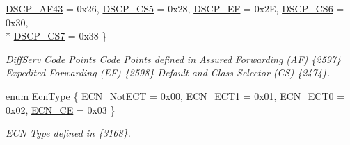 \begin{DoxyCompactItemize}
\hyperlink{classns3_1_1Ipv4Header_aaa17802e7732a689311b72d48d1a3450a615e936e2c88bc8e0f3d6b86b0a270b2}{D\+S\+C\+P\+\_\+\+A\+F43} = 0x26, 
\hyperlink{classns3_1_1Ipv4Header_aaa17802e7732a689311b72d48d1a3450a92772bf045d4537ab9425d9ef9acda7d}{D\+S\+C\+P\+\_\+\+C\+S5} = 0x28, 
\hyperlink{classns3_1_1Ipv4Header_aaa17802e7732a689311b72d48d1a3450aadcec8111d0cf2c52e630119cf1df0c4}{D\+S\+C\+P\+\_\+\+EF} = 0x2E, 
\hyperlink{classns3_1_1Ipv4Header_aaa17802e7732a689311b72d48d1a3450ae54a73d59bac8a02403a64ac7aff581d}{D\+S\+C\+P\+\_\+\+C\+S6} = 0x30, 
\\*
\hyperlink{classns3_1_1Ipv4Header_aaa17802e7732a689311b72d48d1a3450acb993cf8813ac30398e426f5d4609b67}{D\+S\+C\+P\+\_\+\+C\+S7} = 0x38
 \}\begin{DoxyCompactList}\small\item\em Diff\+Serv Code Points Code Points defined in Assured Forwarding (AF) \{2597\} Expedited Forwarding (EF) \{2598\} Default and Class Selector (CS) \{2474\}. \end{DoxyCompactList}
\item 
enum \hyperlink{classns3_1_1Ipv4Header_a9cec46635fa719f0d58234cf8805991b}{Ecn\+Type} \{ \hyperlink{classns3_1_1Ipv4Header_a9cec46635fa719f0d58234cf8805991bab1cf3b8a47cd5245762165478025de56}{E\+C\+N\+\_\+\+Not\+E\+CT} = 0x00, 
\hyperlink{classns3_1_1Ipv4Header_a9cec46635fa719f0d58234cf8805991bac61d3d8c914bc8676450be53729e9e07}{E\+C\+N\+\_\+\+E\+C\+T1} = 0x01, 
\hyperlink{classns3_1_1Ipv4Header_a9cec46635fa719f0d58234cf8805991bab10073bc2cab5a3137367c073b27c75b}{E\+C\+N\+\_\+\+E\+C\+T0} = 0x02, 
\hyperlink{classns3_1_1Ipv4Header_a9cec46635fa719f0d58234cf8805991baf2aad4b9eb59cb90165775476a006a94}{E\+C\+N\+\_\+\+CE} = 0x03
 \}\begin{DoxyCompactList}\small\item\em E\+CN Type defined in \{3168\}. \end{DoxyCompactList}
\end{DoxyCompactItemize}
